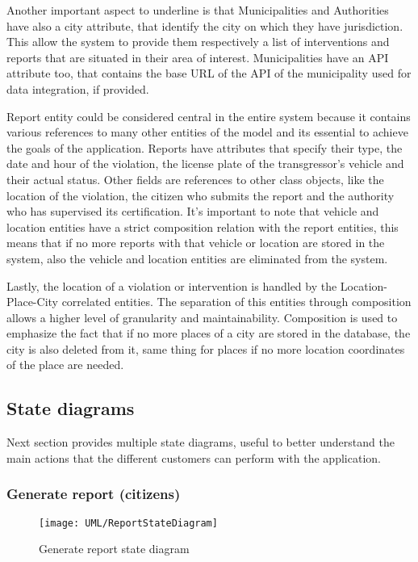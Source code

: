 Another important aspect to underline is that Municipalities and Authorities have also a city attribute, that identify the city on which they have jurisdiction. This allow the system to provide them respectively a list of  interventions and reports that are situated in their area of interest. Municipalities have an API attribute too, that contains the base URL of the API of the municipality used for data integration, if provided.

Report entity could be considered central in the entire system because it contains various references to many other entities of the model and its essential to achieve the goals of the application. Reports have attributes that specify their type, the date and hour of the violation, the license plate of the transgressor's vehicle and their actual status. Other fields are references to other class objects, like the location of the violation, the citizen who submits the report and the authority who has supervised its certification. It's important to note that vehicle and location entities have a strict composition relation with the report entities, this means that if no more reports with that vehicle or location are stored in the system, also the vehicle and location entities are eliminated from the system.

Lastly, the location of a violation or intervention is handled by the Location-Place-City correlated entities. The separation of this entities through composition allows a higher level of granularity and maintainability. Composition is used to emphasize the fact that if no more places of a city are stored in the database, the city is also deleted from it, same thing for places if no more location coordinates of the place are needed.

\subsection{State diagrams}

Next section provides multiple state diagrams, useful to better understand the main actions that the different customers can perform with the application.

\subsubsection{Generate report (citizens)}

\begin{figure}[H]
	\centering
	\texttt{[image: UML/ReportStateDiagram]}
	\caption{Generate report state diagram}
\end{figure}

